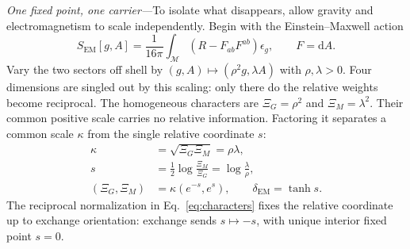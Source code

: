 \documentclass[aps,prl,reprint]{revtex4-2}
\newcommand{\EM}{\mathrm{EM}}
\newcommand{\dd}{\mathrm d}
\begin{document}
\textit{One fixed point, one carrier---}To isolate what disappears, allow gravity and electromagnetism to scale independently. Begin with the Einstein--Maxwell action
\begin{equation}
S_{\EM}[g,A]=\frac{1}{16\pi}\int_{\mathcal M}
\left(R-F_{ab}F^{ab}\right)\epsilon_g,
\qquad F=\dd A .
\label{eq:action}
\end{equation}
Vary the two sectors off shell by $(g,A)\mapsto(\rho^2g,\lambda A)$ with $\rho,\lambda>0$. Four dimensions are singled out by this scaling: only there do the relative weights become reciprocal. The homogeneous characters are $\Xi_G=\rho^2$ and $\Xi_M=\lambda^2$. Their common positive scale carries no relative information. Factoring it separates a common scale $\kappa$ from the single relative coordinate $s$:
\begin{equation}
\begin{aligned}
\kappa&=\sqrt{\Xi_G\Xi_M}=\rho\lambda,\\
s&=\frac12\log\frac{\Xi_M}{\Xi_G}=\log\frac{\lambda}{\rho},\\
(\Xi_G,\Xi_M)&=\kappa(e^{-s},e^s),\qquad
\delta_{\EM}=\tanh s .
\end{aligned}
\label{eq:characters}
\end{equation}
The reciprocal normalization in Eq.~\eqref{eq:characters} fixes the relative coordinate up to exchange orientation: exchange sends $s\mapsto-s$, with unique interior fixed point $s=0$.
\end{document}
